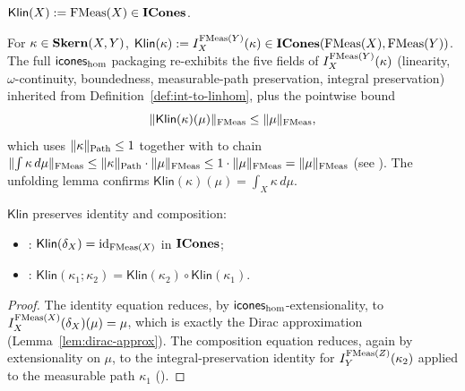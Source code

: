 \begin{definition}\label{def:Klin-obj}%
\rocqok\mathcompok
{}%
$\mathsf{Klin}(X) := \mathrm{FMeas}(X) \in \mathbf{ICones}$.
\end{definition}

\begin{definition}\label{def:Klin-mor}%
\rocqok\mathcompok
{}%
For $\kappa \in \mathbf{Skern}(X, Y)$,
$\mathsf{Klin}(\kappa) := I^{\mathrm{FMeas}(Y)}_X(\kappa) \in
\mathbf{ICones}(\mathrm{FMeas}(X), \mathrm{FMeas}(Y))$. The full $\mathsf{icones}_{\mathrm{hom}}$
packaging re-exhibits the five fields of $I^{\mathrm{FMeas}(Y)}_X(\kappa)$
(linearity, $\omega$-continuity, boundedness, measurable-path
preservation, integral preservation) inherited from
Definition~\ref{def:int-to-linhom}, plus the pointwise
 bound
\[
  \lVert \mathsf{Klin}(\kappa)(\mu) \rVert_{\mathrm{FMeas}} \le \lVert \mu \rVert_{\mathrm{FMeas}},
\]
which uses $\lVert \kappa \rVert_{\mathrm{Path}} \le 1$ together with
to chain $\lVert \int \kappa\,d\mu \rVert_{\mathrm{FMeas}}
\le \lVert \kappa \rVert_{\mathrm{Path}} \cdot \lVert \mu \rVert_{\mathrm{FMeas}}
\le 1 \cdot \lVert \mu \rVert_{\mathrm{FMeas}}
= \lVert \mu \rVert_{\mathrm{FMeas}}$ (see
).
The unfolding lemma
 confirms
$\mathsf{Klin}(\kappa)(\mu) = \int_X \kappa\,d\mu$.
\end{definition}

\begin{proposition}\label{prop:Klin-fun}%
\rocqok\mathcompok
{}
$\mathsf{Klin}$ preserves identity and composition:
\begin{itemize}
  \item {}:
    $\mathsf{Klin}(\delta_X) = \mathrm{id}_{\mathrm{FMeas}(X)}$ in $\mathbf{ICones}$;
  \item {}:
    $\mathsf{Klin}(\kappa_1 \mathbin{;} \kappa_2)
    = \mathsf{Klin}(\kappa_2) \circ \mathsf{Klin}(\kappa_1)$.
\end{itemize}
\end{proposition}
\begin{proof}
The identity equation reduces, by $\mathsf{icones}_{\mathrm{hom}}$-extensional\-ity, to
$I^{\mathrm{FMeas}(X)}_X(\delta_X)(\mu) = \mu$, which is exactly the Dirac
approximation (Lemma~\ref{lem:dirac-approx}). The composition
equation reduces, again by extensionality on $\mu$, to the
integral-preservation identity for $I^{\mathrm{FMeas}(Z)}_Y(\kappa_2)$
applied to the measurable path $\kappa_1$
().
\end{proof}

